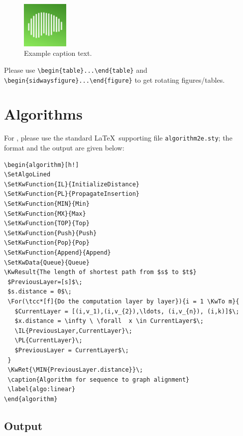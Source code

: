 \documentclass[]{imag-ms-template}
\begin{document}
\begin{figure}[htbp]\begin{center}\includegraphics[width=0.2\textwidth]{figure}
\caption{Example caption text.}
\label{example_figure}\end{center}\end{figure}


Please use \verb!\begin{table}...\end{table}! and\\
\verb!\begin{sidwaysfigure}...\end{figure}! to get rotating figures/tables.


\section{Algorithms}

For \verb@Algorithms@, please use the standard \LaTeX\ supporting file
\verb!algorithm2e.sty!; the format and the output are given below:

\begin{verbatim}
\begin{algorithm}[h!]
\SetAlgoLined
\SetKwFunction{IL}{InitializeDistance}
\SetKwFunction{PL}{PropagateInsertion}
\SetKwFunction{MIN}{Min}
\SetKwFunction{MX}{Max}
\SetKwFunction{TOP}{Top}
\SetKwFunction{Push}{Push}
\SetKwFunction{Pop}{Pop}
\SetKwFunction{Append}{Append}
\SetKwData{Queue}{Queue}
\KwResult{The length of shortest path from $s$ to $t$}
 $PreviousLayer=[s]$\;
 $s.distance = 0$\;
 \For(\tcc*[f]{Do the computation layer by layer}){i = 1 \KwTo m}{
   $CurrentLayer = [(i,v_1),(i,v_{2}),\ldots, (i,v_{n}), (i,k)]$\;
   $x.distance = \infty \ \forall  x \in CurrentLayer$\;
   \IL{PreviousLayer,CurrentLayer}\;
   \PL{CurrentLayer}\;
   $PreviousLayer = CurrentLayer$\;
 }
 \KwRet{\MIN{PreviousLayer.distance}}\;
 \caption{Algorithm for sequence to graph alignment}
 \label{algo:linear}
\end{algorithm}
\end{verbatim}

\subsection*{Output}
\end{document}

